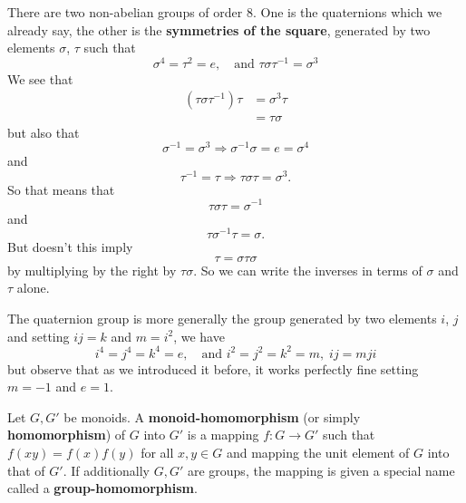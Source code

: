 \begin{ex} 
There are two non-abelian groups of order 8. One is the
quaternions which we already say, the other is the
\textbf{symmetries of the square}, generated
by two elements $\sigma$, $\tau$ such that
\begin{equation}
\sigma^4 = \tau^2 = e,\quad\text{and }\tau\sigma\tau^{-1} =
\sigma^{3}
\end{equation}
We see that
\begin{align*}
(\tau\sigma\tau^{-1})\tau &=
\sigma^{3}\tau\\
&= \tau\sigma
\end{align*}
but also that
\begin{equation}
\sigma^{-1} = \sigma^{3}\Rightarrow \sigma^{-1}\sigma = e =
\sigma^4
\end{equation}
and
\begin{equation}
\tau^{-1} = \tau\Rightarrow \tau\sigma\tau=\sigma^3.
\end{equation}
So that means that
\begin{equation}
\tau\sigma\tau = \sigma^{-1}
\end{equation}
and
\begin{equation}
\tau\sigma^{-1}\tau = \sigma.
\end{equation}
But doesn't this imply
\begin{equation}
\tau = \sigma\tau\sigma
\end{equation}
by multiplying by the right by $\tau\sigma$. So we can write
the inverses in terms of $\sigma$ and $\tau$ alone. \qef
\end{ex}
\begin{ex}
The quaternion group is more generally the group generated
by two elements $i$, $j$ and setting $ij=k$ and $m=i^2$, we
have
\begin{equation}
i^4 = j^4 = k^4 = e,\quad\text{and }i^2=j^2=k^2=m,\; ij=mji
\end{equation}
but observe that as we introduced it before, it works
perfectly fine setting $m=-1$ and $e=1$. \qef
\end{ex}

Let $G,G'$ be monoids. A \textbf{monoid-homomorphism} (or
simply \textbf{homomorphism}) of $G$
into $G'$ is a mapping $f:G\to G'$ such that
$f(xy)=f(x)f(y)$ for all $x,y\in G$ and mapping the unit
element of $G$ into that of $G'$. If additionally $G,G'$ are
groups, the mapping is given a special name called a
\textbf{group-homomorphism}. 

